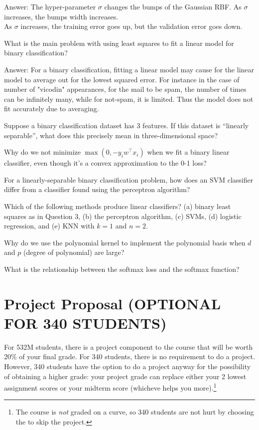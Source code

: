 \documentclass{article}
\def\ans#1{\par\gre{Answer: #1}}
\def\gre#1{{\color{gre}#1}}
\begin{document}
{\ans{The hyper-parameter $\sigma$ changes the bumps of the Gaussian RBF. As $\sigma$ increases, the bumps width increases. \\
As $\sigma$ increases, the training error goes up, but the validation error goes down.}
\item What is the main problem with using least squares to fit a linear model for binary classification?
\ans{For a binary classification, fitting a linear model may cause for the linear model to average out for the lowest squared error. For instance in the case of number of "vicodin" appearances, for the mail to be spam, the number of times can be infinitely many, while for not-spam, it is limited. Thus the model does not fit accurately due to averaging.}
\item Suppose a binary classification dataset has 3 features. If this dataset is ``linearly separable'', what does this precisely mean in three-dimensional space?
\item Why do we not minimize $\max(0, -y_i w^\top x_i)$ when we fit a binary linear classifier, even though it’s a convex approximation to the 0-1 loss?
\item For a linearly-separable binary classification problem, how does an SVM classifier differ from a classifier found using the perceptron algorithm?
\item Which of the following methods produce linear classifiers? (a) binary least squares as in Question 3, (b) the perceptron algorithm, (c) SVMs, (d) logistic regression, and (e) KNN with $k=1$ and $n=2$.
\item Why do we use the polynomial kernel to implement the polynomial basis when $d$ and $p$ (degree of polynomial) are large?
\item What is the relationship between the softmax loss and the softmax function?
}

\pagebreak

\section*{Project Proposal (OPTIONAL FOR 340 STUDENTS)}

For 532M students, there is a project component to the course that will be worth 20\% of your final grade. For 340 students, there is no requirement to do a project. However, 340 students have the option to do a project anyway for the possibility of obtaining a higher grade: your project grade can replace either your 2 lowest assignment scores or your midterm score (whicheve helps you more).\footnote{The course is \emph{not} graded on a curve, so 340 students are not hurt by choosing the to skip the project.}
\end{document}
